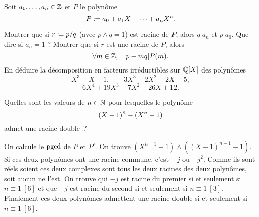 \documentclass{magnolia}
\begin{document}

Soit $a_0,\ldots,a_n \in\mathbb{Z}$ et $P$ le polynôme
$$P\coloneqq a_0+a_1X+\dots+a_nX^n.$$
\begin{questions}
\question Montrer que si $r\coloneqq p/q$ (avec $p\wedge q=1$) est racine de $P$, alors
  $q|a_n$ et $p|a_0$. Que dire si $a_n=1$ ?
\question Montrer que si $r$ est une racine de $P$, alors
  $$\forall m\in\mathbb{Z} ,\quad p-mq|P(m).$$
\question En déduire la décomposition en facteurs irréductibles sur $\polyQ$
  des polynômes
  $$X^3-X-1, \qquad 3X^3-2X^2-2X-5,$$
  $$6X^4+19X^3-7X^2-26X+12.$$
\end{questions}







Quelles sont les valeurs de $n\in\mathbb{N}$ pour lesquelles le polynôme
\[\left(X-1\right)^n-\left(X^n-1\right)\]
admet une racine double~?
\begin{sol}
On calcule le $\operatorname{pgcd}$ de $P$ et $P'$. On trouve
$(X^{n-1}-1)\wedge((X-1)^{n-1}-1)$. Si ces deux polynômes ont une racine commune,
c'est $-j$ ou $-j^2$. Comme ils sont réels soient ces deux complexes sont tous
les deux racines des deux polynômes, soit aucun ne l'est. On trouve
qui $-j$ est racine du premier si et seulement si $n\equiv 1\ [6]$ et que
$-j$ est racine du second si et seulement si $n\equiv 1\ [3]$. Finalement
ces deux polynômes admettent une racine double si et seulement si
$n\equiv 1\ [6]$.
\end{sol}
\end{document}
